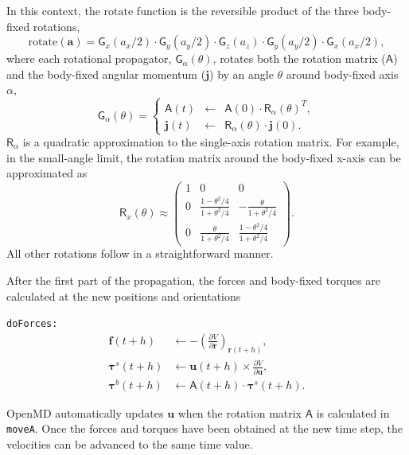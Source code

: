 \documentclass[]{book}
\begin{document}
In this context, the $\mathrm{rotate}$ function is the reversible product
of the three body-fixed rotations,
\begin{equation}
\mathrm{rotate}(\mathbf{a}) = \mathsf{G}_x(a_x / 2) \cdot
\mathsf{G}_y(a_y / 2) \cdot \mathsf{G}_z(a_z) \cdot \mathsf{G}_y(a_y /
2) \cdot \mathsf{G}_x(a_x /2),
\end{equation}
where each rotational propagator, $\mathsf{G}_\alpha(\theta)$, rotates
both the rotation matrix ($\mathsf{A}$) and the body-fixed angular
momentum ($\mathbf{j}$) by an angle $\theta$ around body-fixed axis
$\alpha$,
\begin{equation}
\mathsf{G}_\alpha( \theta ) = \left\{
\begin{array}{lcl}
\mathsf{A}(t) & \leftarrow & \mathsf{A}(0) \cdot \mathsf{R}_\alpha(\theta)^T, \\
\mathbf{j}(t) & \leftarrow & \mathsf{R}_\alpha(\theta) \cdot \mathbf{j}(0).
\end{array}
\right.
\end{equation}
$\mathsf{R}_\alpha$ is a quadratic approximation to
the single-axis rotation matrix.  For example, in the small-angle
limit, the rotation matrix around the body-fixed x-axis can be
approximated as
\begin{equation}
\mathsf{R}_x(\theta) \approx \left(
\begin{array}{ccc}
1 & 0 & 0 \\
0 & \frac{1-\theta^2 / 4}{1 + \theta^2 / 4}  & -\frac{\theta}{1+
\theta^2 / 4} \\
0 & \frac{\theta}{1+
\theta^2 / 4} & \frac{1-\theta^2 / 4}{1 + \theta^2 / 4}
\end{array}
\right).
\end{equation}
All other rotations follow in a straightforward manner.

After the first part of the propagation, the forces and body-fixed
torques are calculated at the new positions and orientations

{\tt doForces:}
\begin{align*}
\mathbf{f}(t + h) &\leftarrow  
	- \left(\frac{\partial V}{\partial \mathbf{r}}\right)_{\mathbf{r}(t + h)}, \\
%
\mathbf{\tau}^{s}(t + h) &\leftarrow \mathbf{u}(t + h)
	\times \frac{\partial V}{\partial \mathbf{u}}, \\
%
\mathbf{\tau}^{b}(t + h) &\leftarrow \mathsf{A}(t + h)
	\cdot \mathbf{\tau}^s(t + h).
\end{align*}

{\sc OpenMD} automatically updates $\mathbf{u}$ when the rotation matrix
$\mathsf{A}$ is calculated in {\tt moveA}.  Once the forces and
torques have been obtained at the new time step, the velocities can be
advanced to the same time value.
\end{document}
